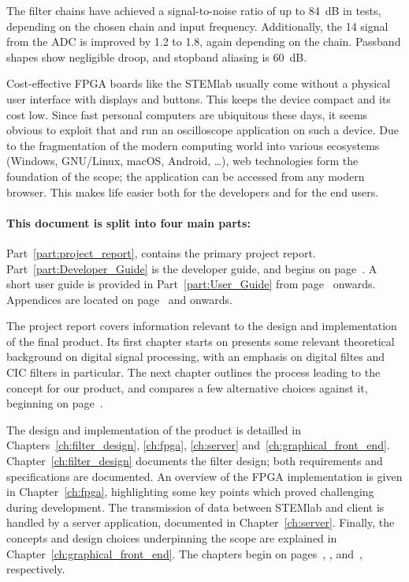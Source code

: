 The filter chains have achieved a  signal-to-noise ratio of up to \SI{84}{\dB}
in tests,  depending on  the chosen  chain and  input frequency. Additionally,
the  \SI{14}{\bit}  signal from  the  ADC  is  improved by  \SI{1.2}{\bit}  to
\SI{1.8}{\bit}, again depending on  the chain. Passband shapes show negligible
droop, and stopband aliasing is \SI{60}{\dB}.

Cost-effective FPGA  boards like the  STEMlab usually come without  a physical
user interface  with displays and  buttons. This keeps the device  compact and
its cost  low.  Since fast  personal computers  are ubiquitous these  days, it
seems obvious  to exploit that and  run an oscilloscope application  on such a
device. Due to  the fragmentation of  the modern computing world  into various
ecosystems (Windows, GNU/Linux, macOS, Android, \ldots), web technologies form
the foundation of  the scope; the application can be  accessed from any modern
browser. This makes life easier both for the developers and for the end users.

\paragraph{This      document      is      split      into      four      main
parts:} Part~\ref{part:project_report},    contains   the    primary   project
report. Part~\ref{part:Developer_Guide}   is   the    developer   guide,   and
begins   on  page~\pageref{part:Developer_Guide}. A   short   user  guide   is
provided  in  Part~\ref{part:User_Guide}  from  page~\pageref{part:User_Guide}
onwards. Appendices   are   located   on   page~\pageref{ch:app:fdesign}   and
onwards.

The   project  report   covers  information   relevant  to   the  design   and
implementation of the final product. Its first chapter starts on presents some
relevant theoretical background on digital signal processing, with an emphasis
on digital  filtes  and CIC  filters in particular. The next  chapter outlines
the  process leading  to  the concept  for  our product,  and  compares a  few
alternative choices against it, beginning on page~\pageref{ch:mission}.

The    design   and    implementation    of   the    product   is    detailled
in     Chapters~\ref{ch:filter_design},     \ref{ch:fpga},     \ref{ch:server}
and~\ref{ch:graphical_front_end}. Chapter~\ref{ch:filter_design} documents the
filter  design;  both  requirements   and  specifications  are  documented. An
overview  of  the  FPGA  implementation  is  given  in  Chapter~\ref{ch:fpga},
highlighting some key points  which proved challenging during development. The
transmission   of   data   between   STEMlab  and   client   is   handled   by
a   server   application,  documented   in   Chapter~\ref{ch:server}. Finally,
the    concepts   and    design   choices    underpinning   the    scope   are
explained   in    Chapter~\ref{ch:graphical_front_end}. The   chapters   begin
on  pages~\pageref{ch:filter_design},  \pageref{ch:fpga},  \pageref{ch:server}
and~\pageref{ch:graphical_front_end}, respectively.

